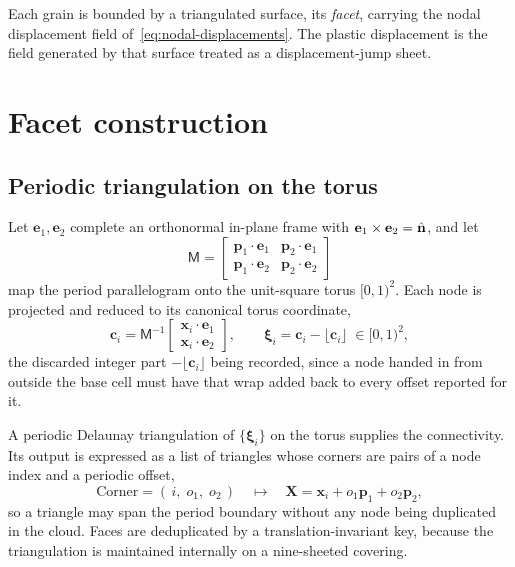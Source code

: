 Each grain is bounded by a triangulated surface, its \emph{facet}, carrying the
nodal displacement field of~\eqref{eq:nodal-displacements}. The plastic
displacement is the field generated by that surface treated as a
displacement-jump sheet.

\section*{Facet construction}

\subsection*{Periodic triangulation on the torus}

Let $\mathbf{e}_1, \mathbf{e}_2$ complete an orthonormal in-plane frame with
$\mathbf{e}_1 \times \mathbf{e}_2 = \hat{\mathbf{n}}$, and let
\begin{equation}
  \mathsf{M} =
  \begin{bmatrix}
    \mathbf{p}_1\cdot\mathbf{e}_1 & \mathbf{p}_2\cdot\mathbf{e}_1 \\
    \mathbf{p}_1\cdot\mathbf{e}_2 & \mathbf{p}_2\cdot\mathbf{e}_2
  \end{bmatrix}
  \label{eq:torus-map}
\end{equation}
map the period parallelogram onto the unit-square torus $[0,1)^2$. Each node is
projected and reduced to its canonical torus coordinate,
\begin{equation}
  \mathbf{c}_i = \mathsf{M}^{-1}
  \begin{bmatrix} \mathbf{x}_i\cdot\mathbf{e}_1 \\
                  \mathbf{x}_i\cdot\mathbf{e}_2 \end{bmatrix},
  \qquad
  \boldsymbol{\xi}_i = \mathbf{c}_i - \lfloor \mathbf{c}_i \rfloor
  \; \in [0,1)^2 ,
  \label{eq:canonical-uv}
\end{equation}
the discarded integer part $-\lfloor \mathbf{c}_i \rfloor$ being recorded, since
a node handed in from outside the base cell must have that wrap added back to
every offset reported for it.

A periodic Delaunay triangulation of $\{\boldsymbol{\xi}_i\}$ on the torus
supplies the connectivity. Its output is expressed as a list of triangles whose
corners are pairs of a node index and a periodic offset,
\begin{equation}
  \text{Corner} = (\,i,\; o_1,\; o_2\,)
  \quad\longmapsto\quad
  \mathbf{X} = \mathbf{x}_i + o_1\mathbf{p}_1 + o_2\mathbf{p}_2 ,
  \label{eq:corner}
\end{equation}
so a triangle may span the period boundary without any node being duplicated in
the cloud. Faces are deduplicated by a translation-invariant key, because the
triangulation is maintained internally on a nine-sheeted covering.

